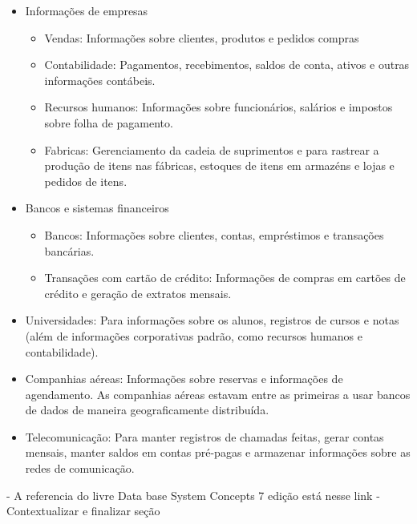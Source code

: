 \begin{itemize}
    \item Informações de empresas
        \begin{itemize}
            \item Vendas: Informações sobre clientes, produtos e pedidos compras
            \item Contabilidade: Pagamentos, recebimentos, saldos de conta, ativos e outras informações contábeis.
            \item Recursos humanos: Informações sobre funcionários, salários e impostos sobre folha de pagamento.
            \item Fabricas: Gerenciamento da cadeia de suprimentos e para rastrear a produção de itens nas fábricas, estoques de itens em armazéns e lojas e pedidos de itens.
        \end{itemize}
    
    \item Bancos e sistemas financeiros
        \begin{itemize}
            \item Bancos: Informações sobre clientes, contas, empréstimos e transações bancárias.
            \item Transações com cartão de crédito: Informações de compras em cartões de crédito e geração de extratos mensais.
        \end{itemize}
    
    \item Universidades: Para informações sobre os alunos, registros de cursos e notas (além de informações corporativas padrão, como recursos humanos e contabilidade).
    
    \item Companhias aéreas: Informações sobre reservas e informações de agendamento. As companhias aéreas estavam entre as primeiras a usar bancos de dados de maneira geograficamente distribuída.   
    
    \item Telecomunicação: Para manter registros de chamadas feitas, gerar contas mensais, manter saldos em contas pré-pagas e armazenar informações sobre as redes de comunicação.

\end{itemize}

- A referencia do livre Data base System Concepts 7 edição está nesse link
- Contextualizar e finalizar seção

